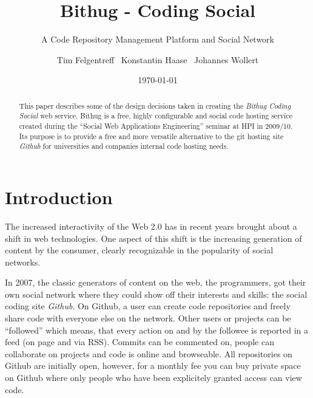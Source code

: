 \documentclass{llncs}
\begin{document}
\pagestyle{headings}  %
\mainmatter %
\title{Bithug - Coding Social}
\subtitle{A Code Repository Management Platform and Social Network}
\author{Tim Felgentreff~ Konstantin Haase~ Johannes Wollert}
\date{\today}

\maketitle
\begin{abstract}
  This paper describes some of the design decisions taken in creating
  the \emph{Bithug Coding Social} web service. Bithug is a free, highly 
  configurable and social code hosting service created during the ``Social 
  Web Applications Engineering'' seminar at HPI in 2009/10. Its purpose is to 
  provide a free and more versatile alternative to the git hosting 
  site \emph{Github} for universities and companies internal code hosting needs.
\end{abstract}
\section{Introduction}
The increased interactivity of the Web 2.0 has in recent years brought about a 
shift in web technologies. One aspect of this shift is the increasing generation
of content by the consumer, clearly recognizable in the popularity of social 
networks.

In 2007, the classic generators of content on the web, the programmers, got 
their own social network where they could show off their interests and skills: 
the social coding site \emph{Github}\cite{github:www}. On Github, a user can 
create code repositories and freely share code with everyone else on the network.
Other users or projects can be ``followed'' which means, that every action on 
and by the followee is reported in a feed (on page and via RSS). Commits
can be commented on, people can collaborate on projects and code is online and 
browseable.
All repositories on Github are initially open, however, for a monthly fee you 
can buy private space on Github where only people who have been explicitely 
granted access can view code.
\end{document}
